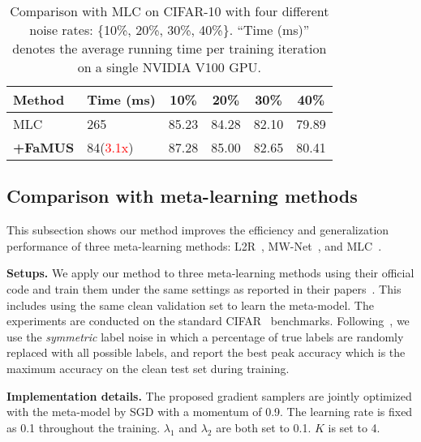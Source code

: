 \documentclass[final]{cvpr}
\begin{document}
\iftrue
\begin{table}[t]
	\centering
	\small
	\begin{tabular}{|l|l|cccc|}
		\hline
		Method & Time (ms) & 10\% & 20\% & 30\% & 40\% \\
		\hline
		MLC~\cite{wang2020training} & 265 & 85.23 & 84.28 & 82.10 & 79.89 \\ 
		\hline
		\textbf{+FaMUS} & 84(\textcolor{red}{3.1x}) & 87.28 & 85.00 & 82.65 & 80.41 \\
		\hline
	\end{tabular}
	\vspace{-2mm}
	\caption{Comparison with MLC on CIFAR-10 with four different noise rates: \{10\%, 20\%, 30\%, 40\%\}. ``Time (ms)'' denotes the average running time per training iteration on a single NVIDIA V100 GPU.}\label{tab:cifar10_mlc_uniform}
	\vspace{-5mm}
\end{table}
\fi 


\subsection{Comparison with meta-learning methods}\label{sec:comp_meta_methods}

This subsection shows our method improves the efficiency and generalization performance of three meta-learning methods: L2R~\cite{ren2018learning}, MW-Net~\cite{shu2019meta}, and MLC~\cite{wang2020training}. 

\textbf{Setups.} We apply our method to three meta-learning methods using their official code and train them under the same settings as reported in their papers~\cite{ren2018learning, shu2019meta, wang2020training}. This includes using the same clean validation set to learn the meta-model. The experiments are conducted on the standard CIFAR~\cite{krizhevsky2009learning} benchmarks. Following~\cite{wang2020training}, we use the \textit{symmetric} label noise in which a percentage of true labels are randomly replaced with all possible labels, and report the best peak accuracy which is the maximum accuracy on the clean test set during training. 

\textbf{Implementation details.} The proposed gradient samplers are jointly optimized with the meta-model by SGD with a momentum of 0.9. The learning rate is fixed as 0.1 throughout the training. 
$\lambda_1$ and $\lambda_2$ are both set to 0.1. $K$ is set to 4.
\end{document}
